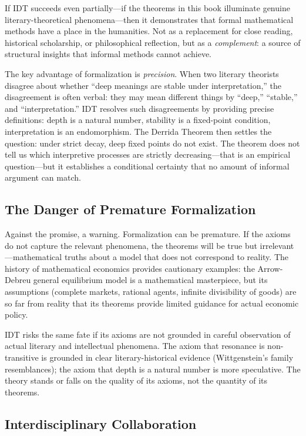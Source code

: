 \documentclass[11pt,openany]{book}
\theoremstyle{definition}
\theoremstyle{plain}
\theoremstyle{remark}
\begin{document}
If IDT succeeds even partially---if the theorems in this book illuminate genuine literary-theoretical phenomena---then it demonstrates that formal mathematical methods have a place in the humanities. Not as a replacement for close reading, historical scholarship, or philosophical reflection, but as a \emph{complement}: a source of structural insights that informal methods cannot achieve.

The key advantage of formalization is \emph{precision}. When two literary theorists disagree about whether ``deep meanings are stable under interpretation,'' the disagreement is often verbal: they may mean different things by ``deep,'' ``stable,'' and ``interpretation.'' IDT resolves such disagreements by providing precise definitions: depth is a natural number, stability is a fixed-point condition, interpretation is an endomorphism. The Derrida Theorem then settles the question: under strict decay, deep fixed points do not exist. The theorem does not tell us which interpretive processes are strictly decreasing---that is an empirical question---but it establishes a conditional certainty that no amount of informal argument can match.

\subsection{The Danger of Premature Formalization}

Against the promise, a warning. Formalization can be premature. If the axioms do not capture the relevant phenomena, the theorems will be true but irrelevant---mathematical truths about a model that does not correspond to reality. The history of mathematical economics provides cautionary examples: the Arrow-Debreu general equilibrium model is a mathematical masterpiece, but its assumptions (complete markets, rational agents, infinite divisibility of goods) are so far from reality that its theorems provide limited guidance for actual economic policy.

IDT risks the same fate if its axioms are not grounded in careful observation of actual literary and intellectual phenomena. The axiom that resonance is non-transitive is grounded in clear literary-historical evidence (Wittgenstein's family resemblances); the axiom that depth is a natural number is more speculative. The theory stands or falls on the quality of its axioms, not the quantity of its theorems.

\subsection{Interdisciplinary Collaboration}
\end{document}
